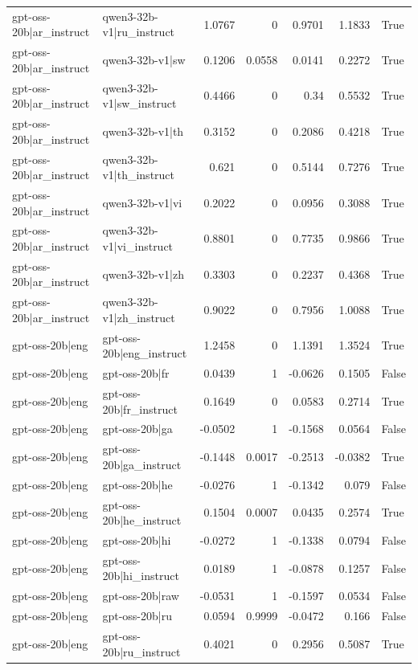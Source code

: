 \begin{table}
\begin{tabular}{l l r r r r l}
gpt-oss-20b|ar_instruct & qwen3-32b-v1|ru_instruct & 1.0767 & 0 & 0.9701 & 1.1833 & True \\
gpt-oss-20b|ar_instruct & qwen3-32b-v1|sw & 0.1206 & 0.0558 & 0.0141 & 0.2272 & True \\
gpt-oss-20b|ar_instruct & qwen3-32b-v1|sw_instruct & 0.4466 & 0 & 0.34 & 0.5532 & True \\
gpt-oss-20b|ar_instruct & qwen3-32b-v1|th & 0.3152 & 0 & 0.2086 & 0.4218 & True \\
gpt-oss-20b|ar_instruct & qwen3-32b-v1|th_instruct & 0.621 & 0 & 0.5144 & 0.7276 & True \\
gpt-oss-20b|ar_instruct & qwen3-32b-v1|vi & 0.2022 & 0 & 0.0956 & 0.3088 & True \\
gpt-oss-20b|ar_instruct & qwen3-32b-v1|vi_instruct & 0.8801 & 0 & 0.7735 & 0.9866 & True \\
gpt-oss-20b|ar_instruct & qwen3-32b-v1|zh & 0.3303 & 0 & 0.2237 & 0.4368 & True \\
gpt-oss-20b|ar_instruct & qwen3-32b-v1|zh_instruct & 0.9022 & 0 & 0.7956 & 1.0088 & True \\
gpt-oss-20b|eng & gpt-oss-20b|eng_instruct & 1.2458 & 0 & 1.1391 & 1.3524 & True \\
gpt-oss-20b|eng & gpt-oss-20b|fr & 0.0439 & 1 & -0.0626 & 0.1505 & False \\
gpt-oss-20b|eng & gpt-oss-20b|fr_instruct & 0.1649 & 0 & 0.0583 & 0.2714 & True \\
gpt-oss-20b|eng & gpt-oss-20b|ga & -0.0502 & 1 & -0.1568 & 0.0564 & False \\
gpt-oss-20b|eng & gpt-oss-20b|ga_instruct & -0.1448 & 0.0017 & -0.2513 & -0.0382 & True \\
gpt-oss-20b|eng & gpt-oss-20b|he & -0.0276 & 1 & -0.1342 & 0.079 & False \\
gpt-oss-20b|eng & gpt-oss-20b|he_instruct & 0.1504 & 0.0007 & 0.0435 & 0.2574 & True \\
gpt-oss-20b|eng & gpt-oss-20b|hi & -0.0272 & 1 & -0.1338 & 0.0794 & False \\
gpt-oss-20b|eng & gpt-oss-20b|hi_instruct & 0.0189 & 1 & -0.0878 & 0.1257 & False \\
gpt-oss-20b|eng & gpt-oss-20b|raw & -0.0531 & 1 & -0.1597 & 0.0534 & False \\
gpt-oss-20b|eng & gpt-oss-20b|ru & 0.0594 & 0.9999 & -0.0472 & 0.166 & False \\
gpt-oss-20b|eng & gpt-oss-20b|ru_instruct & 0.4021 & 0 & 0.2956 & 0.5087 & True \\

\end{tabular}
\end{table}
